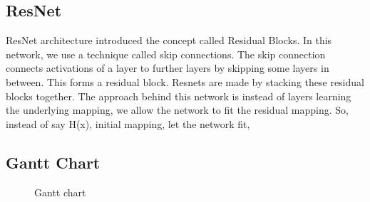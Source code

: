        

        \subsection*{ResNet}
        ResNet architecture introduced the concept called Residual Blocks. In this network, we use a technique called skip connections. The skip connection connects activations of a  layer to further layers by skipping some layers in between. This forms a residual block. Resnets are made by stacking these residual blocks together. 
        The approach behind this network is instead of layers learning the underlying mapping, we allow the network to fit the residual mapping. So, instead of say H(x), initial mapping, let the network fit,

        \begin{figure}[hbt!]
        \end{figure}


        \newpage
        \justifying
        \subsection{Gantt Chart}
            \begin{figure}[hbt!]
                \caption{Gantt chart}
            \end{figure}

